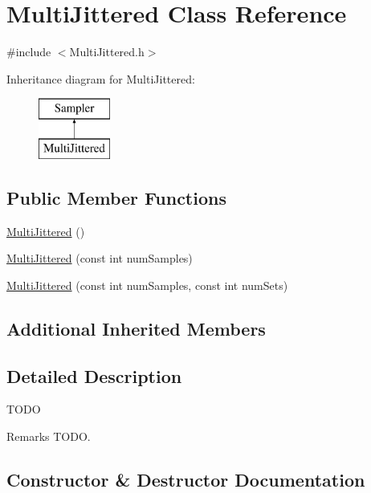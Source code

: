 \hypertarget{class_multi_jittered}{}\section{Multi\+Jittered Class Reference}
\label{class_multi_jittered}


{\ttfamily \#include $<$Multi\+Jittered.\+h$>$}

Inheritance diagram for Multi\+Jittered\+:\begin{figure}[H]
\begin{center}
\leavevmode
\includegraphics[height=2.000000cm]{class_multi_jittered}
\end{center}
\end{figure}
\subsection*{Public Member Functions}
\begin{DoxyCompactItemize}
\item 
\hyperlink{class_multi_jittered_a2480bb454a04e682683cb302567cbd55}{Multi\+Jittered} ()
\item 
\hyperlink{class_multi_jittered_a6788f23e84fc6ae4029c7fd408c8e671}{Multi\+Jittered} (const int num\+Samples)
\item 
\hyperlink{class_multi_jittered_a8b59445dea3b73a787082f8d2f5fb8b9}{Multi\+Jittered} (const int num\+Samples, const int num\+Sets)
\end{DoxyCompactItemize}
\subsection*{Additional Inherited Members}


\subsection{Detailed Description}
T\+O\+DO \begin{DoxyRemark}{Remarks}
T\+O\+DO. 
\end{DoxyRemark}


\subsection{Constructor \& Destructor Documentation}
\hypertarget{class_multi_jittered_a2480bb454a04e682683cb302567cbd55}{}\label{class_multi_jittered_a2480bb454a04e682683cb302567cbd55} 
